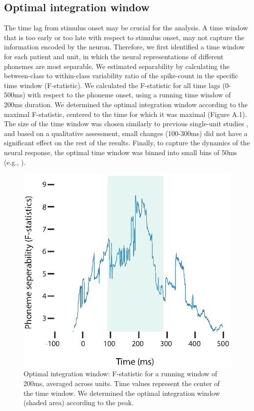 \subsection{Optimal integration window}
The time lag from stimulus onset may be crucial for the analysis. A time window that is too early or too late with respect to stimulus onset, may not capture the information encoded by the neuron. Therefore, we first identified a time window for each patient and unit, in which the neural representations of different phonemes are most separable. We estimated separability by calculating the between-class to within-class variability ratio of the spike-count in the specific time window (F-statistic). We calculated the F-statistic for all time lags (0-500ms) with respect to the phoneme onset, using a running time window of 200ms duration. We determined the optimal integration window according to the maximal F-statistic, centered to the time for which it was maximal (Figure A.1). The size of the time window was chosen similarly to previous single-unit studies \citep{cash2015emergence}, and based on a qualitative assessment, small changes (100-300ms) did not have a significant effect on the rest of the results. Finally, to capture the dynamics of the neural response, the optimal time window was binned into small bins of 50ms (e.g., \citealp{Mesgarani2014}). 
\begin{figure}[H]
\vspace{.3in}
\includegraphics[width=\linewidth]{Figures/Ch3/Figure1_new.eps}
\caption{Optimal integration window: F-statistic for a running window of 200ms, averaged across units. Time values represent the center of the time window. We determined the optimal integration window (shaded area) according to the peak.}
\end{figure}

